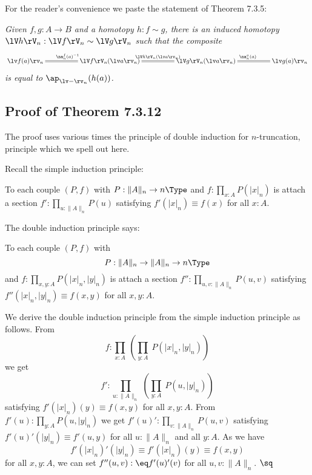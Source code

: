 \documentclass[12pt]{article}
\begin{document}
For the reader's convenience we paste the statement of Theorem 7.3.5:

\nn{} \emph{Given $f,g:A\to B$ and a homotopy $h:f\sim g$, there is an induced homotopy $\lV h\rV_n:\lV f\rV_n\sim\lV g\rV_n$ such that the composite
\begin{equation}\label{735}
\xymatrix@C=50pt{
\lv f(a)\rv_n\ar@{=}[r]^{\na^f_n(a)^{-1}}&
\lV f\rV_n(\lv a\rv_n)\ar@{=}[r]^{\lV h\rV_n(\lv a\rv_n)}&
\lV g\rV_n(\lv a\rv_n)\ar@{=}[r]^{\na^g_n(a)}&
\lv g(a)\rv_n}
\end{equation}
is equal to $\ap_{\lv-\rv_n}(h(a))$.}


\subsection{Proof of Theorem 7.3.12}

The proof uses various times the principle of double induction for $n$-truncation, principle which we spell out here.

Recall the simple induction principle:

To each couple $(P,f)$ with $P:\lVert A\rVert_n\to n\Type$ and $f:\prod_{x:A}P(\lvert x\rvert_n)$ is attach a section $f':\prod_{u:\lVert A\rVert_n}P(u)$ satisfying $f'(\lvert x\rvert_n)\equiv f(x)$ for all $x:A$.

The double induction principle says:

To each couple $(P,f)$ with $$P:\lVert A\rVert_n\to\lVert A\rVert_n\to n\Type$$ and $f:\prod_{x,y:A}P(\lvert x\rvert_n,\lvert y\rvert_n)$ is attach a section $f'':\prod_{u,v:\lVert A\rVert_n}P(u,v)$ satisfying $f''(\lvert x\rvert_n,\lvert y\rvert_n)\equiv f(x,y)$ for all $x,y:A$.

We derive the double induction principle from the simple induction principle as follows. From 
$$
f:\prod_{x:A}\ \left(\prod_{y:A}\ P(\lvert x\rvert_n,\lvert y\rvert_n)\right)
$$ 
we get 
$$
f':\prod_{u:\lVert A\rVert_n}\ \left(\prod_{y:A}\ P(u,\lvert y\rvert_n)\right)
$$ 
satisfying $f'(\lvert x\rvert_n)(y)\equiv f(x,y)$ for all $x,y:A$. From $f'(u):\prod_{y:A}P(u,\lvert y\rvert_n)$ we get $f'(u)':\prod_{v:\lVert A\rVert_n}P(u,v)$ satisfying $f'(u)'(\lvert y\rvert_n)\equiv f'(u,y)$ for all $u:\lVert A\rVert_n$ and all $y:A$. As we have 
$$
f'(\lvert x\rvert_n)'(\lvert y\rvert_n)\equiv f'(\lvert x\rvert_n)(y)\equiv f(x,y) 
$$ 
for all $x,y:A$, we can set $f''(u,v):\eq f'(u)'(v)$ for all $u,v:\lVert A\rVert_n$. $\sq$
\end{document}
